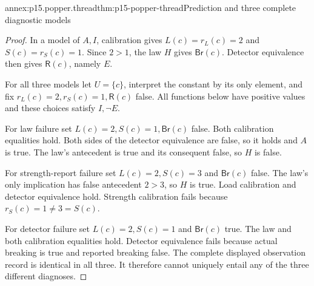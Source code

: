 \begin{annexitem}{annex:p15.popper.thread}{thm:p15-popper-thread}{Prediction and three complete diagnostic models}
\begin{proof}
In a model of \(A,I\), calibration gives
\(L(c)=r_L(c)=2\) and \(S(c)=r_S(c)=1\).
Since \(2>1\), the law \(H\) gives \(\mathsf{Br}(c)\).
Detector equivalence then gives \(\mathsf R(c)\), namely \(E\).

For all three models let \(U=\{c\}\), interpret the constant
by its only element, and fix
\(r_L(c)=2,r_S(c)=1,\mathsf R(c)\) false.
All functions below have positive values and these choices satisfy
\(I,\neg E\).

For law failure set \(L(c)=2,S(c)=1,\mathsf{Br}(c)\) false.
Both calibration equalities hold. Both sides of the detector
equivalence are false, so it holds and \(A\) is true.
The law's antecedent is true and its consequent false, so \(H\)
is false.

For strength-report failure set \(L(c)=2,S(c)=3\) and
\(\mathsf{Br}(c)\) false. The law's only implication has
false antecedent \(2>3\), so \(H\) is true.
Load calibration and detector equivalence hold.
Strength calibration fails because \(r_S(c)=1\neq3=S(c)\).

For detector failure set \(L(c)=2,S(c)=1\) and
\(\mathsf{Br}(c)\) true. The law and both calibration equalities
hold. Detector equivalence fails because actual breaking is true
and reported breaking false.
The complete displayed observation record is identical in all three.
It therefore cannot uniquely entail any of the three different
diagnoses.
\end{proof}
\end{annexitem}


